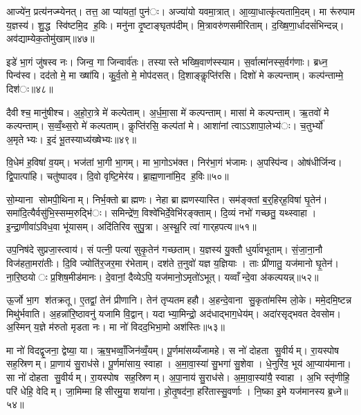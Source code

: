 आज्ये॑न॒ प्रत्य॑नज्म्येनत्। तत्त॒ आ प्या॑यतां॒ पुन॑ः। अज्या॑यो यवमा॒त्रात्। आ॒व्या॒धात्कृ॑त्यतामि॒दम्। मा रू॑रुपाम य॒ज्ञस्य॑। शु॒द्ध स्वि॑ष्टमि॒द ह॒विः। मनु॑ना दृ॒ष्टाङ्घृतप॑दीम्। मि॒त्रावरु॑णसमीरिताम्। द॒ख्षि॒णा॒र्धादसं॑भिन्दन्न्। अव॑द्याम्येक॒तोमु॑खाम्॥४७॥

इडे॑ भा॒गं जु॑षस्व नः। जिन्व॒ गा जिन्वार्व॑तः। तस्यास्ते भख्षि॒वाण॑स्स्याम। स॒र्वात्मा॑नस्स॒र्वग॑णाः। ब्रध्न॒ पिन्व॑स्व। दद॑तो मे॒ मा ख्षा॑यि। कु॒र्व॒तो मे॒ मोप॑दसत्। दि॒शाङ्कॢप्ति॑रसि। दिशो॑ मे कल्पन्ताम्। कल्प॑न्ताम्मे॒ दिश॑ः॥४८॥

दैवीश्च॒ मानु॑षीश्च। अ॒हो॒रा॒त्रे मे॑ कल्पेताम्। अ॒र्ध॒मा॒सा मे॑ कल्पन्ताम्। मासा॑ मे कल्पन्ताम्। ऋ॒तवो॑ मे कल्पन्ताम्। स॒व्वँ॒थ्स॒रो मे॑ कल्पताम्। कॢप्ति॑रसि॒ कल्प॑तां मे। आशा॑नां त्वाऽऽशापा॒लेभ्य॑ः। च॒तुर्भ्यो॑ अ॒मृतेभ्यः। इ॒दं भू॒तस्याध्य॑ख्षेभ्यः॥४९॥

वि॒धेम॑ ह॒विषा॑ व॒यम्। भज॑तां भा॒गी भा॒गम्। मा भा॒गोऽभ॑क्त। निर॑भा॒गं भ॑जामः। अ॒पस्पि॑न्व। ओष॑धीर्जिन्व। द्वि॒पात्पा॑हि। चतु॑ष्पादव। दि॒वो वृष्टि॒मेर॑य। ब्रा॒ह्म॒णाना॑मि॒द ह॒विः॥५०॥

सो॒म्याना सोमपी॒थिनाम्। निर्भ॒क्तो ब्राह्मणः। नेहा ब्राह्मणस्यास्ति। सम॑ङ्क्तां ब॒र्॒हिर्‌ह॒विषा॑ घृ॒तेन॑। समा॑दि॒त्यैर्वसु॑भि॒स्सम्म॒रुद्भि॑ः। समिन्द्रे॑ण॒ विश्वे॑भिर्दे॒वेभि॑रङ्क्ताम्। दि॒व्यं नभो॑ गच्छतु॒ यथ्स्वाहा। इ॒न्द्रा॒णीवा॑ऽविध॒वा भू॑यासम्। अदि॑तिरिव सुपु॒त्रा। अ॒स्थू॒रि त्वा॑ गार्‌हपत्य॥५१॥

उप॒निष॑दे सुप्रजा॒स्त्वाय॑। सं पत्नी॒ पत्या॑ सुकृ॒तेन॑ गच्छताम्। य॒ज्ञस्य॑ यु॒क्तौ धुर्या॑वभूताम्। सं॒जा॒ना॒नौ विज॑हता॒मरा॑तीः। दि॒वि ज्योति॑र॒जर॒मा र॑भेताम्। दश॑ते त॒नुवो॑ यज्ञ य॒ज्ञियाः। ताः प्री॑णातु॒ यज॑मानो घृ॒तेन॑। ना॒रि॒ष्ठयोः प्र॒शिष॒मीड॑मानः। दे॒वानां॒ दैव्येऽपि॒ यज॑मानो॒ऽमृतो॑ऽभूत्। यव्वाँन्दे॒वा अ॑कल्पयन्न्॥५२॥

ऊ॒र्जो भा॒ग श॑तक्रतू। ए॒तद्वां॒ तेन॑ प्रीणानि। तेन॑ तृप्यतमहहौ। अ॒हन्दे॒वाना सु॒कृता॑मस्मि लो॒के। ममे॒दमि॒ष्टन्न मिथु॑र्भवाति। अ॒हन्ना॑रि॒ष्ठावनु॑ यजामि वि॒द्वान्। यदाभ्या॒मिन्द्रो॒ अद॑धाद्भाग॒धेय॑म्। अदा॑रसृद्भवत देवसोम। अ॒स्मिन् य॒ज्ञे म॑रुतो मृडता नः। मा नो॑ विदद॒भिभा॒मो अश॑स्तिः॥५३॥

मा नो॑ विदद्वृ॒जना॒ द्वेष्या॒ या। ऋ॒ष॒भव्वाँ॒जिन॑व्वँ॒यम्। पू॒र्णमा॑सय्यँजामहे। स नो॑ दोहता सु॒वीर्यम्। रा॒यस्पोष सह॒स्रिणम्। प्रा॒णाय॑ सु॒राध॑से। पू॒र्णमा॑साय॒ स्वाहा। अ॒मा॒वा॒स्या॑ सु॒भगा॑ सु॒शेवा। धे॒नुरि॑व॒ भूय॑ आ॒प्याय॑माना। सा नो॑ दोहता सु॒वीर्यम्। रा॒यस्पोष सह॒स्रिणम्। अ॒पा॒नाय॑ सु॒राध॑से। अ॒मा॒वा॒स्या॑यै॒ स्वाहा। अ॒भि स्तृ॑णीहि॒ परि॑ धेहि॒ वेदिम्। जा॒मिम्मा हिसीरमु॒या शया॑ना। हो॒तृ॒षद॑ना॒ हरि॑तास्सु॒वर्णाः। नि॒ष्का इ॒मे यज॑मानस्य ब्र॒ध्ने॥५४॥

